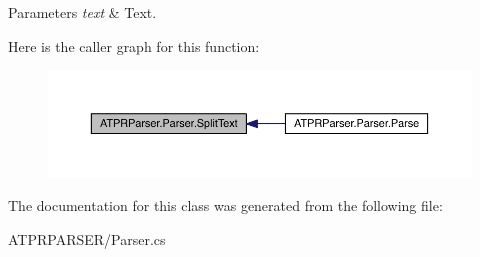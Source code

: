 \begin{DoxyParams}{Parameters}
{\em text} & Text.\\
\hline
\end{DoxyParams}
Here is the caller graph for this function\+:
\nopagebreak
\begin{figure}[H]
\begin{center}
\leavevmode
\includegraphics[width=350pt]{df/d53/class_a_t_p_r_parser_1_1_parser_adb6ac564b6ddc976a82a46d66f91bb54_icgraph}
\end{center}
\end{figure}


The documentation for this class was generated from the following file\+:\begin{DoxyCompactItemize}
\item 
A\+T\+P\+R\+P\+A\+R\+S\+E\+R/Parser.\+cs\end{DoxyCompactItemize}
